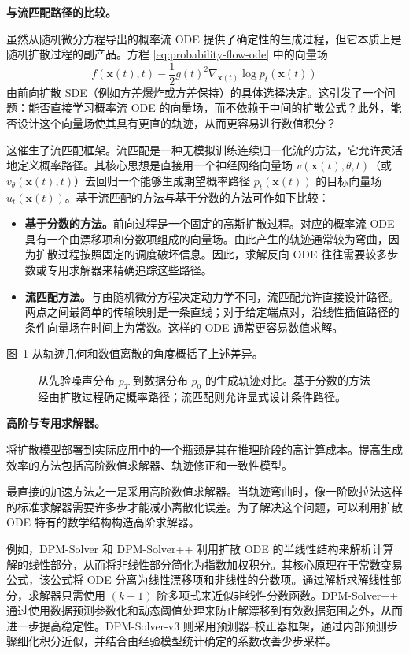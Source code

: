\textbf{与流匹配路径的比较。}

虽然从随机微分方程导出的概率流 ODE 提供了确定性的生成过程，但它本质上是随机扩散过程的副产品。方程 \eqref{eq:probability-flow-ode} 中的向量场
\[
f(\mathbf{x}(t), t)-\frac{1}{2}g(t)^2
\nabla_{\mathbf{x}(t)}\log p_t(\mathbf{x}(t))
\]
由前向扩散 SDE（例如方差爆炸或方差保持）的具体选择决定。这引发了一个问题：能否直接学习概率流 ODE 的向量场，而不依赖于中间的扩散公式？此外，能否设计这个向量场使其具有更直的轨迹，从而更容易进行数值积分？

这催生了流匹配框架。流匹配是一种无模拟训练连续归一化流的方法，它允许灵活地定义概率路径。其核心思想是直接用一个神经网络向量场 $v(\mathbf{x}(t), \theta, t)$（或 $v_{\theta}(\mathbf{x}(t), t)$）去回归一个能够生成期望概率路径 $p_t(\mathbf{x}(t))$ 的目标向量场 $u_t(\mathbf{x}(t))$。基于流匹配的方法与基于分数的方法可作如下比较：
\begin{itemize}
\item \textbf{基于分数的方法。}前向过程是一个固定的高斯扩散过程。对应的概率流 ODE 具有一个由漂移项和分数项组成的向量场。由此产生的轨迹通常较为弯曲，因为扩散过程按照固定的调度破坏信息。因此，求解反向 ODE 往往需要较多步数或专用求解器来精确追踪这些路径。
\item \textbf{流匹配方法。}与由随机微分方程决定动力学不同，流匹配允许直接设计路径。两点之间最简单的传输映射是一条直线；对于给定端点对，沿线性插值路径的条件向量场在时间上为常数。这样的 ODE 通常更容易数值求解。
\end{itemize}

图~\ref{fig:fm-vs-diffusion} 从轨迹几何和数值离散的角度概括了上述差异。

\begin{figure}[!t]
\centering
{}
\caption{从先验噪声分布 $p_T$ 到数据分布 $p_0$ 的生成轨迹对比。基于分数的方法经由扩散过程确定概率路径；流匹配则允许显式设计条件路径。}
\label{fig:fm-vs-diffusion}
\end{figure}

\textbf{高阶与专用求解器。}

将扩散模型部署到实际应用中的一个瓶颈是其在推理阶段的高计算成本。提高生成效率的方法包括高阶数值求解器、轨迹修正和一致性模型。

最直接的加速方法之一是采用高阶数值求解器。当轨迹弯曲时，像一阶欧拉法这样的标准求解器需要许多步才能减小离散化误差。为了解决这个问题，可以利用扩散 ODE 特有的数学结构构造高阶求解器。

例如，DPM-Solver 和 DPM-Solver++ 利用扩散 ODE 的半线性结构来解析计算解的线性部分，从而将非线性部分简化为指数加权积分。其核心原理在于常数变易公式，该公式将 ODE 分离为线性漂移项和非线性的分数项。通过解析求解线性部分，求解器只需使用 $(k-1)$ 阶多项式来近似非线性分数函数。DPM-Solver++ 通过使用数据预测参数化和动态阈值处理来防止解漂移到有效数据范围之外，从而进一步提高稳定性。DPM-Solver-v3 则采用预测器--校正器框架，通过内部预测步骤细化积分近似，并结合由经验模型统计确定的系数改善少步采样。

